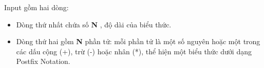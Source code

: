 Input gồm hai dòng:  
\begin{itemize}
	\item     Dòng thứ nhất chứa số    \textbf{     N    }    , độ dài của biểu thức.   
	\item     Dòng thứ hai gồm    \textbf{     N    }    phần tử: mỗi phần tử là một số nguyên hoặc một trong các dấu cộng (+), trừ (-) hoặc nhân (*), thể hiện một biểu thức dưới dạng Postfix Notation.   
\end{itemize}